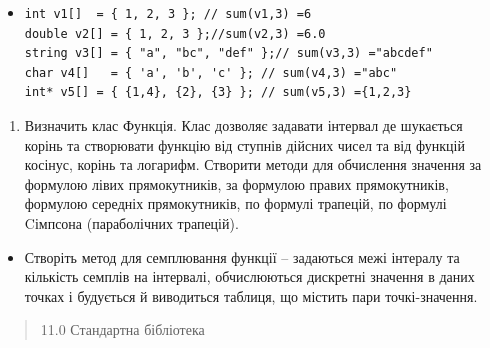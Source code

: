 \documentclass[]{article}
\begin{document}
\begin{itemize}
\item
\begin{verbatim}
int v1[]  = { 1, 2, 3 }; // sum(v1,3) =6 
double v2[] = { 1, 2, 3 };//sum(v2,3) =6.0 
string v3[] = { "a", "bc", "def" };// sum(v3,3) ="abcdef"
char v4[]   = { 'a', 'b', 'c' }; // sum(v4,3) ="abc"
int* v5[] = { {1,4}, {2}, {3} }; // sum(v5,3) ={1,2,3}
\end{verbatim}
\end{itemize}

\begin{enumerate}
\def\labelenumi{\arabic{enumi}.}
\item
  Визначить клас Функція. Клас дозволяє задавати інтервал де шукається
  корінь та створювати функцію від ступнів дійсних чисел та від функцій
  косінус, корінь та логарифм. Створити методи для обчислення значення
  за формулою лівих прямокутників, за формулою правих прямокутників,
  формулою середніх прямокутників, по формулі трапецій, по формулі
  Cімпсона (параболічних трапецій).
\end{enumerate}

\begin{itemize}
\item
  Створіть метод для семплювання функції -- задаються межі інтералу та
  кількість семплів на інтервалі, обчислюються дискретні значення в
  даних точках і будується й виводиться таблиця, що містить пари
  точкі-значення.
\end{itemize}

\begin{quote}
11.0 Стандартна бібліотека
\end{quote}
\end{document}
